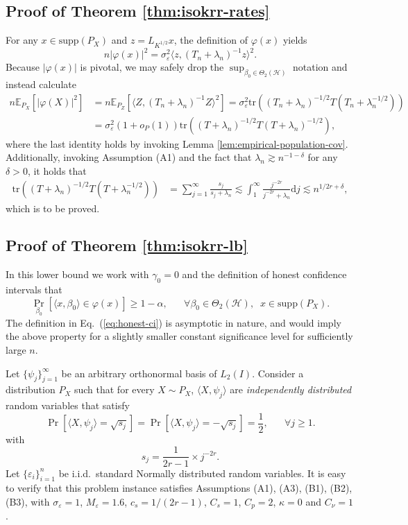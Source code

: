 \documentclass[11pt,a4paper]{article}
\newcommand{\tr}{\mathrm{tr}}
\theoremstyle{definition}
\theoremstyle{plain}
\theoremstyle{remark}
\newcommand{\supp}{\mathrm{supp}}
\newcommand{\ud}{\mathrm d}
\newcommand{\mH}{\mathcal H}
\begin{document}
\subsection{Proof of Theorem \ref{thm:isokrr-rates}}

For any $x\in\supp(P_X)$ and $z=L_{K^{1/2}}x$, the definition of $\varphi(x)$ yields
$$
n\big|\varphi(x)\big|^2 = \sigma_\varepsilon^2\langle z, (T_n+\lambda_n)^{-1}z\rangle^2.
$$
Because $|\varphi(x)|$ is pivotal, we may safely drop the $\sup_{\beta_0\in\Theta_2(\mH)}$ notation and instead calculate
\begin{align*}
n\mathbb E_{P_X}\left[|\varphi(X)|^2\right] &= n\mathbb E_{P_Z}[\langle Z,(T_n+\lambda_n)^{-1}Z\rangle^2] = \sigma_\varepsilon^2\tr((T_n+\lambda_n)^{-1/2}T(T_n+\lambda_n^{-1/2}))\\
&= \sigma_\varepsilon^2(1+o_P(1))\tr((T+\lambda_n)^{-1/2}T(T+\lambda_n)^{-1/2}),
\end{align*}
where the last identity holds by invoking Lemma \ref{lem:empirical-population-cov}. Additionally, invoking Assumption (A1) and the fact that $\lambda_n\gtrsim n^{-1-\delta}$ for any $\delta>0$, it holds that
\begin{align*}
\tr((T+\lambda_n)^{-1/2}T(T+\lambda_n^{-1/2})) &= \sum_{j=1}^{\infty} \frac{s_j}{s_j+\lambda_n} \lesssim \int_1^{\infty}\frac{j^{-2r}}{j^{-2r}+\lambda_n}\ud j\lesssim n^{1/2r+\delta},
\end{align*}
which is to be proved.


\subsection{Proof of Theorem \ref{thm:isokrr-lb}}

In this lower bound we work with $\gamma_0=0$ and the definition of honest confidence intervals that
$$
\Pr_{\beta_0}[\langle x,\beta_0\rangle\in\varphi(x)] \geq 1-\alpha,\;\;\;\;\;\;\forall \beta_0\in\Theta_2(\mH),\;\;x\in\supp(P_X).
$$
The definition in Eq.~(\ref{eq:honest-ci}) is asymptotic in nature, and would imply the above property for a slightly smaller constant significance level for sufficiently large $n$.

Let $\{\psi_j\}_{j=1}^{\infty}$ be an arbitrary orthonormal basis of $L_2(I)$.
Consider a distribution $P_X$ such that for every $X\sim P_X$, $\langle X,\psi_j\rangle$ are \emph{independently distributed} random variables that satisfy
$$
\Pr[\langle X,\psi_j\rangle = \sqrt{s_j}] = \Pr[\langle X,\psi_j\rangle = -\sqrt{s_j}] = \frac{1}{2},\;\;\;\;\;\;\forall j\geq 1.
$$
with
$$
s_j = \frac{1}{2r-1}\times j^{-2r}.
$$
Let $\{\varepsilon_i\}_{i=1}^n$ be i.i.d.~standard Normally distributed random variables. It is easy to verify that this problem instance satisfies Assumptions (A1), (A3), (B1), (B2), (B3),
with $\sigma_\varepsilon=1$, $M_\varepsilon=1.6$, $c_s=1/(2r-1)$, $C_s=1$, $C_p=2$, $\kappa=0$ and $C_\nu=1$.
\end{document}
